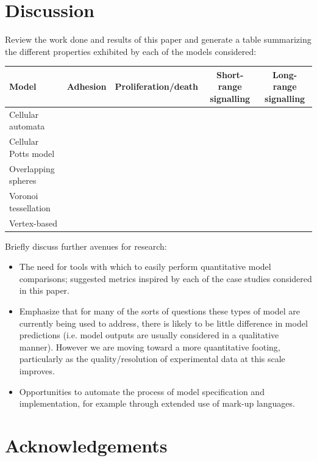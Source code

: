 \documentclass{article}
\begin{document}
\section{Discussion} \label{sec:discussion}

Review the work done and results of this paper and generate a table summarizing the different properties exhibited by each of the models considered:

\begin{center}
\begin{tabular}{|l|c|c|c|c|}
\hline Model & Adhesion & Proliferation/death & Short-range signalling & Long-range signalling \\ 
\hline Cellular automata &  &  &  &  \\ 
\hline Cellular Potts model &  &  &  &  \\ 
\hline Overlapping spheres &  &  &  &  \\ 
\hline Voronoi tessellation &  &  &  &  \\ 
\hline Vertex-based &  &  &  &  \\ 
\hline 
\end{tabular}
\end{center}

\noindent Briefly discuss further avenues for research:
\begin{itemize}
\item The need for tools with which to easily perform quantitative model comparisons; suggested metrics inspired by each of the case studies considered in this paper.
\item Emphasize that for many of the sorts of questions these types of model are currently being used to address, there is likely to be little difference in model predictions (i.e. model outputs are usually considered in a qualitative manner). However we are moving toward a more quantitative footing, particularly as the quality/resolution of experimental data at this scale improves.
\item Opportunities to automate the process of model specification and implementation, for example through extended use of mark-up languages.
\end{itemize}

\section*{Acknowledgements}
\end{document}
